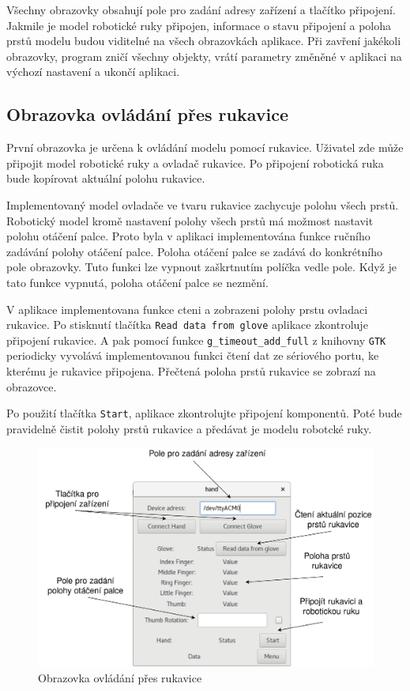\documentclass[thesis=B,czech]{FITthesis}[2012/06/26]
\begin{document}
Všechny obrazovky obsahují pole pro zadání adresy zařízení a tlačítko připojení. Jakmile je model robotické ruky připojen, informace o stavu připojení a poloha prstů modelu budou viditelné na všech obrazovkách aplikace. Při zavření jakékoli obrazovky, program zničí všechny objekty, vrátí parametry změněné v aplikaci na výchozí nastavení a ukončí aplikaci.

\newpage

\subsection{Obrazovka ovládání přes rukavice}

První obrazovka je určena k ovládání modelu pomocí rukavice. Uživatel zde může připojit model robotické ruky a ovladač rukavice. Po připojení robotická ruka bude kopírovat aktuální polohu rukavice. 


Implementovaný model ovladače ve tvaru rukavice zachycuje polohu všech prstů. Robotický model kromě nastavení polohy všech prstů  má možmost nastavit polohu otáčení palce. Proto byla v aplikaci implementována funkce ručního zadávání polohy otáčení palce. Poloha otáčení palce se zadává do konkrétního pole obrazovky. Tuto funkci lze vypnout zaškrtnutím políčka vedle pole. Když je tato funkce vypnutá, poloha otáčení palce se nezmění.


V aplikace implementovana funkce cteni a zobrazeni polohy prstu ovladaci rukavice. Po stisknutí tlačítka \texttt{Read data from glove} aplikace zkontroluje připojení rukavice. A pak pomocí funkce \texttt{g\_timeout\_add\_full} z knihovny \texttt{GTK} periodicky vyvolává implementovanou funkci čtení dat ze sériového portu, ke kterému je rukavice připojena. Přečtená poloha prstů rukavice se zobrazí na obrazovce.


Po použití tlačítka \texttt{Start}, aplikace zkontrolujte připojení komponentů. Poté bude pravidelně čistit polohy prstů rukavice a předávat je modelu robotcké ruky.


 \begin{figure}[H]
\centering
\includegraphics[scale=0.22]{./image/AppScreen1.png}
\caption{Obrazovka ovládání přes rukavice}
\label{fig:AppScreen1}
\end{figure} 
\end{document}
